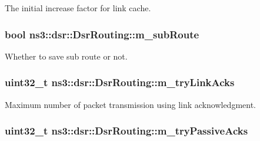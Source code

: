 The initial increase factor for link cache. 

\subsubsection[{\texorpdfstring{m\+\_\+sub\+Route}{m_subRoute}}]{\setlength{\rightskip}{0pt plus 5cm}bool ns3\+::dsr\+::\+Dsr\+Routing\+::m\+\_\+sub\+Route\hspace{0.3cm}{\ttfamily [private]}}\hypertarget{classns3_1_1dsr_1_1DsrRouting_a83f7a7d54f8b078d987d46cf6edcd08e}{}\label{classns3_1_1dsr_1_1DsrRouting_a83f7a7d54f8b078d987d46cf6edcd08e}


Whether to save sub route or not. 

\subsubsection[{\texorpdfstring{m\+\_\+try\+Link\+Acks}{m_tryLinkAcks}}]{\setlength{\rightskip}{0pt plus 5cm}uint32\+\_\+t ns3\+::dsr\+::\+Dsr\+Routing\+::m\+\_\+try\+Link\+Acks\hspace{0.3cm}{\ttfamily [private]}}\hypertarget{classns3_1_1dsr_1_1DsrRouting_acecdd106e259c448bcfa6a6cef901658}{}\label{classns3_1_1dsr_1_1DsrRouting_acecdd106e259c448bcfa6a6cef901658}


Maximum number of packet transmission using link acknowledgment. 

\subsubsection[{\texorpdfstring{m\+\_\+try\+Passive\+Acks}{m_tryPassiveAcks}}]{\setlength{\rightskip}{0pt plus 5cm}uint32\+\_\+t ns3\+::dsr\+::\+Dsr\+Routing\+::m\+\_\+try\+Passive\+Acks\hspace{0.3cm}{\ttfamily [private]}}\hypertarget{classns3_1_1dsr_1_1DsrRouting_aadd1dd676ec50cae94ffd6f2eefb277c}{}\label{classns3_1_1dsr_1_1DsrRouting_aadd1dd676ec50cae94ffd6f2eefb277c}


